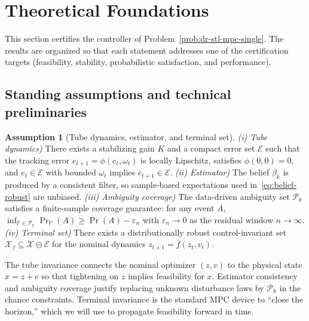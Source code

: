 \documentclass[journal]{IEEEtran}
\theoremstyle{definition}
\newtheorem{assumption}{Assumption}
\begin{document}
\section{Theoretical Foundations}
\label{sec:theory}

This section certifies the controller of Problem~\ref{prob:dr-stl-mpc-single}. The results are organized so that each statement addresses one of the certification targets (feasibility, stability, probabilistic satisfaction, and performance).  

\subsection{Standing assumptions and technical preliminaries}

\begin{assumption}[Tube dynamics, estimator, and terminal set]
\label{ass:standing}
\emph{(i) Tube dynamics)} There exists a stabilizing gain $K$ and a compact error set $\mathcal{E}$ such that the tracking error $e_{t+1}=\phi(e_t,\omega_t)$ is locally Lipschitz, satisfies $\phi(0,0)=0$, and $e_t\in\mathcal{E}$ with bounded $\omega_t$ implies $e_{t+1}\in\mathcal{E}$. \emph{(ii) Estimator)} The belief $\beta_k$ is produced by a consistent filter, so sample-based expectations used in~\eqref{eq:belief-robust} are unbiased. \emph{(iii) Ambiguity coverage)} The data-driven ambiguity set $\mathcal{P}_k$ satisfies a finite-sample coverage guarantee: for any event $A$, $\inf_{\mathbb{P}\in\mathcal{P}_k}\Pr_{\mathbb{P}}(A)\ge \Pr(A)-\varepsilon_n$ with $\varepsilon_n\!\to\!0$ as the residual window $n\!\to\!\infty$. \emph{(iv) Terminal set)} There exists a distributionally robust control-invariant set $\mathcal{X}_f\subseteq \mathcal{X}\ominus \mathcal{E}$ for the nominal dynamics $z_{t+1}=\bar f(z_t,v_t)$.
\end{assumption}
 
The tube invariance connects the nominal optimizer $(z,v)$ to the physical state $x=z+e$ so that tightening on $z$ implies feasibility for $x$. Estimator consistency and ambiguity coverage justify replacing unknown disturbance laws by $\mathcal{P}_k$ in the chance constraints. Terminal invariance is the standard MPC device to ``close the horizon,'' which we will use to propagate feasibility forward in time.
\end{document}
